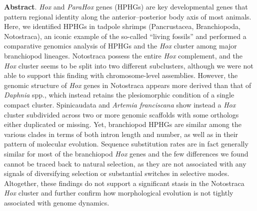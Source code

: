 \documentclass[../main.tex]{subfiles}
\begin{document}
\textbf{Abstract}. \textit{Hox} and \textit{ParaHox} genes (HPHGs) are key developmental genes that pattern regional identity along the anterior–posterior body axis of most animals. Here, we identified HPHGs in tadpole shrimps (Pancrustacea, Branchiopoda, Notostraca), an iconic example of the so-called “living fossils” and performed a comparative genomics analysis of HPHGs and the \textit{Hox} cluster among major branchiopod lineages. Notostraca possess the entire \textit{Hox} complement, and the \textit{Hox} cluster seems to be split into two different subclusters, although we were not able to support this finding with chromosome-level assemblies. However, the genomic structure of \textit{Hox} genes in Notostraca appears more derived than that of \textit{Daphnia} spp., which instead retains the plesiomorphic condition of a single compact cluster. Spinicaudata and \textit{Artemia franciscana} show instead a \textit{Hox} cluster subdivided across two or more genomic scaffolds with some orthologs either duplicated or missing. Yet, branchiopod HPHGs are similar among the various clades in terms of both intron length and number, as well as in their pattern of molecular evolution. Sequence substitution rates are in fact generally similar for most of the branchiopod \textit{Hox} genes and the few differences we found cannot be traced back to natural selection, as they are not associated with any signals of diversifying selection or substantial switches in selective modes. Altogether, these findings do not support a significant stasis in the Notostraca \textit{Hox} cluster and further confirm how morphological evolution is not tightly associated with genome dynamics.

\clearpage

\end{document}
